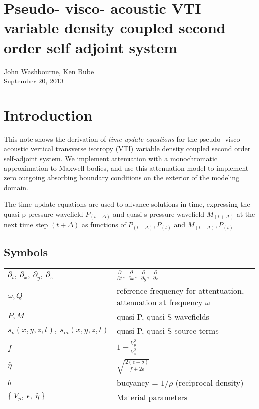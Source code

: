 \documentclass[10pt,fleqn]{article}
\begin{document}
\section{Pseudo- visco- acoustic VTI variable density coupled second order self adjoint system}
John Washbourne, Ken Bube\\
September 20, 2013

\section{Introduction}
This note shows the derivation of \textit{time update equations} for the pseudo- visco-
acoustic vertical transverse isotropy (VTI) variable density coupled second order self-adjoint
system. We implement attenuation with a monochromatic approximation to Maxwell bodies, and use
this attenuation model to implement zero outgoing absorbing boundary conditions on the exterior
of the modeling domain.
\vspace{10pt}

The time update equations are used to advance solutions in time, expressing the quasi-p
pressure wavefield $P_{(t + \Delta)}$ and quasi-s pressure wavefield $M_{(t + \Delta)}$
at the next time step $(t + \Delta)$ as functions of $P_{(t - \Delta)}, P_{(t)}$ and $M_{(t - \Delta)}, P_{(t)}$

\subsection{Symbols}
\begin{center}
\begin{tabular}{ll} \\[-10pt]
$\partial_t,\ \partial_x,\ \partial_y,\ \partial_z$ & $ 
\displaystyle \frac{\partial }{\partial t},\ 
\displaystyle \frac{\partial }{\partial x},\ 
\displaystyle \frac{\partial }{\partial y},\ 
\displaystyle \frac{\partial }{\partial z} $ \\[15pt]
$\omega, Q$ & reference frequency for attentuation, attenuation at frequency $\omega$ \\[10pt]
$P, M$ & quasi-P, quasi-S wavefields\\[10pt]
$s_p(x,y,z,t),\ s_m(x,y,z,t)$ & quasi-P, quasi-S source terms\\[10pt]
$f$ & $ 1 - \displaystyle \frac{V_p^2}{V_s^2} $\\[10pt]
$ \widehat{\eta} $ & $ \sqrt{ \displaystyle \frac{2 \left(\epsilon - \delta\right) }{f + 2 \epsilon } } $\\[10pt]
$b$ & buoyancy = $\displaystyle 1/\rho $ (reciprocal density) \\[10pt]
$ \{\ V_p,\ \epsilon,\ \widehat{\eta}\ \} $ & Material parameters \\[10pt]
\end{tabular}
\end{center}
\end{document}
